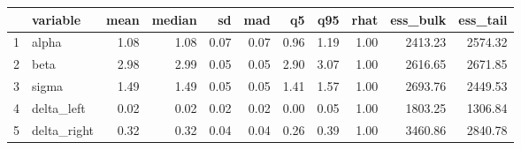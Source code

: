 \begin{table}[ht]
\centering
\begin{tabular}{rlrrrrrrrrr}
  \hline
 & variable & mean & median & sd & mad & q5 & q95 & rhat & ess\_bulk & ess\_tail \\ 
  \hline
1 & alpha & 1.08 & 1.08 & 0.07 & 0.07 & 0.96 & 1.19 & 1.00 & 2413.23 & 2574.32 \\ 
  2 & beta & 2.98 & 2.99 & 0.05 & 0.05 & 2.90 & 3.07 & 1.00 & 2616.65 & 2671.85 \\ 
  3 & sigma & 1.49 & 1.49 & 0.05 & 0.05 & 1.41 & 1.57 & 1.00 & 2693.76 & 2449.53 \\ 
  4 & delta\_left & 0.02 & 0.02 & 0.02 & 0.02 & 0.00 & 0.05 & 1.00 & 1803.25 & 1306.84 \\ 
  5 & delta\_right & 0.32 & 0.32 & 0.04 & 0.04 & 0.26 & 0.39 & 1.00 & 3460.86 & 2840.78 \\ 
   \hline
\end{tabular}
\end{table}
